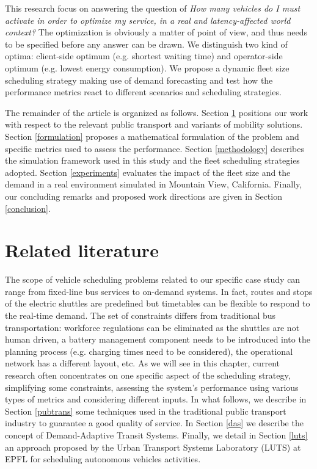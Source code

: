 \documentclass[12pt,a4paper]{article}
\begin{document}
This research focus on answering the question of \textit{How many vehicles do I must activate in order to optimize my service, in a real and latency-affected world context?} The optimization is obviously a matter of point of view, and thus needs to be specified before any answer can be drawn. We distinguish two kind of optima: client-side optimum (e.g.  shortest waiting time) and operator-side optimum (e.g. lowest energy consumption). We propose a dynamic fleet size scheduling strategy making use of demand forecasting and test how the performance metrics react to different scenarios and scheduling strategies. 

The remainder of the article is organized as follows. Section \ref{literature} positions our work with respect to the relevant public transport and variants of mobility solutions. Section \ref{formulation} proposes a mathematical formulation of the problem and specific metrics used to assess the performance. Section \ref{methodology} describes the simulation framework used in this study and the fleet scheduling strategies adopted. Section \ref{experiments} evaluates the impact of the fleet size and the demand in a real environment simulated in Mountain View, California. Finally, our concluding remarks and proposed work directions are given in Section \ref{conclusion}.  


\section{Related literature}\label{literature} 
The scope of vehicle scheduling problems related to our specific case study can range from fixed-line bus services to on-demand systems. In fact, routes and stops of the electric shuttles are predefined but timetables can be flexible to respond to the real-time demand. The set of constraints differs from traditional bus transportation: workforce regulations can be eliminated as the shuttles are not human driven, a battery management component needs to be introduced into the planning process (e.g. charging times need to be considered), the operational network has a different layout, etc. As we will see in this chapter, current research often concentrates on one specific aspect of the scheduling strategy, simplifying some constraints, assessing the system's performance using various types of metrics and considering different inputs. In what follows, we describe in Section \ref{pubtrans} some techniques used in the traditional public transport industry to guarantee a good quality of service. In Section \ref{das} we describe the concept of Demand-Adaptive Transit Systems. Finally, we detail in Section \ref{luts} an approach proposed by the Urban Transport Systems Laboratory (LUTS) at EPFL for scheduling autonomous vehicles activities.  
\end{document}
